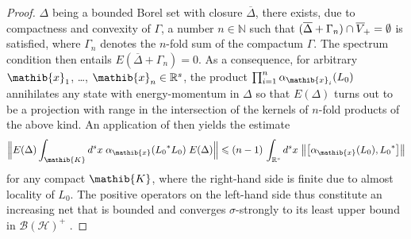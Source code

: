 \documentclass[a4paper,a4paper]{article}
\numberwithin{equation}{section}
\newcommand{\Nbb}{\mathbb{N}}
\newcommand{\Kib}{\mathib{K}}
\newcommand{\xib}{\mathib{x}}
\newcommand{\Rs}{\mathbb{R}^s}
\newcommand{\BH}{\mathscr{B} ( \mathscr{H} )}
\newcommand{\fwcone}{\overline{V}_{\negthinspace +}}
\newcommand{\ED}{E ( \Delta )}
\newcommand{\aibx}{\alpha_\mathib{x}}
\theoremstyle{definition}
\theoremstyle{plain}
\theoremstyle{remark}
\newcommand{\bcomm}[2]{\bigl[ #1 , #2 \bigr]}
\newcommand{\bnorm}[1]{\bigl\lVert #1 \bigr\rVert}
\newcommand{\Bnorm}[1]{\Bigl\lVert #1 \Bigr\rVert}
\begin{document}
  \begin{proof}
    $\Delta$ being a bounded Borel set with closure
    $\overline{\Delta}$, there exists, due to compactness and
    convexity of $\Gamma$, a number $n \in \Nbb$ such that $(
    \overline{\Delta} + \Gamma_n ) \cap \fwcone = \emptyset$ is
    satisfied, where $\Gamma_n$ denotes the $n$-fold sum of the
    compactum $\Gamma$. The spectrum condition then entails $E (
    \overline{\Delta} + \Gamma_n ) = 0$. As a consequence, for
    arbitrary $\xib_1$, \dots, $\xib_n \in \Rs$, the product $\prod_{i
    = 1}^n \alpha_{\xib_i} ( L_0 )$ annihilates any state with
    energy-momentum in $\Delta$ so that $\ED$ turns out to be a
    projection with range in the intersection of the kernels of
    $n$-fold products of the above kind. An application of
    \cite[Lemma~2.2]{buchholz:1990} then yields the estimate
    \begin{equation}
      \label{eq:harmonic-analysis-commutator-estimate}
      \Bnorm{\ED \int_\Kib d^s x \; \aibx ( {L_0}^* L_0 ) \; \ED}
      \leqslant ( n - 1 ) \, \int_{\Rs} d^s x \; \bnorm{\bcomm{\aibx (
      L_0 )}{{L_0}^*}}
    \end{equation}
    for any compact $\Kib$, where the right-hand side is finite due to
    almost locality of $L_0$. The positive operators on the left-hand
    side thus constitute an increasing net that is bounded and
    converges $\sigma$-strongly to its least upper bound in $\BH^+$
    \cite[Lemma~2.4.19]{bratteli/robinson:1987}.
  

\end{proof}
\end{document}
